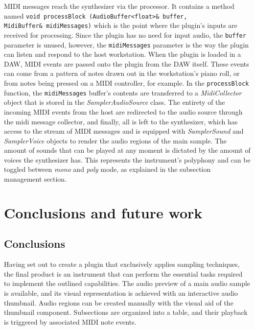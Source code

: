 \documentclass[12pt, a4paper, hidelinks]{report}
\begin{document}
	MIDI messages reach the synthesizer via the processor. It contains a method named \texttt{void processBlock (AudioBuffer<float>\& buffer, \\MidiBuffer\& midiMessages)} which is the point where the plugin's inputs are received for processing. Since the plugin has no need for input audio, the \texttt{buffer} parameter is unused, however, the \texttt{midiMessages} parameter is the way the plugin can listen and respond to the host workstation. When the plugin is loaded in a DAW, MIDI events are passed onto the plugin from the DAW itself. These events can come from a pattern of notes drawn out in the workstation's piano roll, or from notes being pressed on a MIDI controller, for example. In the \texttt{processBlock} function, the \texttt{midiMessages} buffer's contents are transferred to a \textit{MidiCollector} object that is stored in the \textit{SamplerAudioSource} class. The entirety of the incoming MIDI events from the host are redirected to the audio source through the midi message collector, and finally, all is left to the synthesizer, which has access to the stream of MIDI messages and is equipped with \textit{SamplerSound} and \textit{SamplerVoice} objects to render the audio regions of the main sample. The amount of sounds that can be played at any moment is dictated by the amount of voices the synthesizer has. This represents the instrument's polyphony and can be toggled between \textit{mono} and \textit{poly} mode, as explained in the subsection management section.
	\par
	
	
	\chapter{Conclusions and future work}
	\section{Conclusions}
	Having set out to create a plugin that exclusively applies sampling techniques, the final product is an instrument that can perform the essential tasks required to implement the outlined capabilities. The audio preview of a main audio sample is available, and its visual representation is achieved with an interactive audio thumbnail. Audio regions can be created manually with the visual aid of the thumbnail component. Subsections are organized into a table, and their playback is triggered by associated MIDI note events. \par 
	
\end{document}
